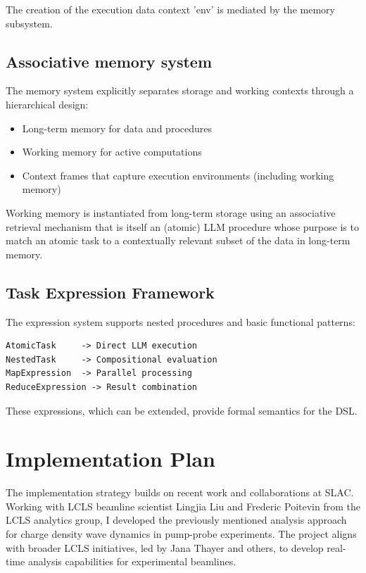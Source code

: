 \documentclass{article}
\begin{document}
The creation of the execution data context 'env' is mediated by the memory subsystem.

\subsection{Associative memory system}
The memory system explicitly separates storage and working contexts through a hierarchical design:
\begin{itemize}
    \item Long-term memory for data and procedures
    \item Working memory for active computations
    \item Context frames that capture execution environments (including working memory)
\end{itemize}

Working memory is instantiated from long-term storage using an associative retrieval mechanism that is itself an (atomic) LLM procedure whose purpose is to match an atomic task to a contextually relevant subset of the data in long-term memory.

\subsection{Task Expression Framework}
The expression system supports nested procedures and basic functional patterns:

\begin{lstlisting}[caption=Task Expression Types]
AtomicTask     -> Direct LLM execution
NestedTask     -> Compositional evaluation  
MapExpression  -> Parallel processing
ReduceExpression -> Result combination
\end{lstlisting}

These expressions, which can be extended, provide formal semantics for the DSL.

\section{Implementation Plan}
The implementation strategy builds on recent work and collaborations at SLAC. Working with LCLS beamline scientist Lingjia Liu and Frederic Poitevin from the LCLS analytics group, I developed the previously mentioned analysis approach for charge density wave dynamics in pump-probe experiments. The project aligns with broader LCLS initiatives, led by Jana Thayer and others, to develop real-time analysis capabilities for experimental beamlines.
\end{document}
